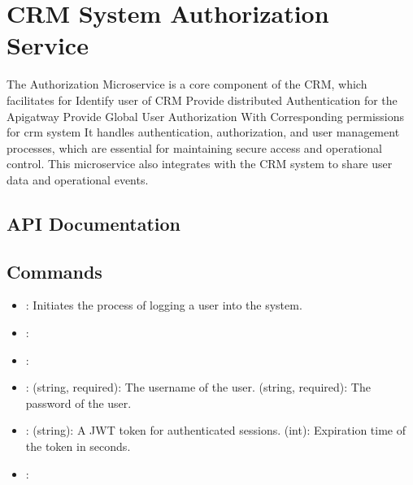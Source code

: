 \documentclass[letterpaper,10pt,english]{sphinxmanual}
\begin{document}
\section{CRM System Authorization Service}
\label{\detokenize{crm_system/authorization_service:crm-system-authorization-service}}\label{\detokenize{crm_system/authorization_service::doc}}
\sphinxAtStartPar
The Authorization Microservice is a core component of the CRM, which facilitates for
\sphinxhyphen{} Identify user of CRM
\sphinxhyphen{} Provide distributed Authentication for the Apigatway
\sphinxhyphen{} Provide Global User Authorization With Corresponding permissions for crm system
It handles authentication, authorization, and user management processes, which are essential for maintaining secure access and operational control. This microservice also integrates with the CRM system to share user data and operational events.



\subsection{API Documentation}
\label{\detokenize{crm_system/authorization_service:api-documentation}}

\subsection{Commands}
\label{\detokenize{crm_system/authorization_service:commands}}
\sphinxAtStartPar
{}
\begin{itemize}
\item {} 
\sphinxAtStartPar
{}: Initiates the process of logging a user into the system.

\item {} 
\sphinxAtStartPar
{}: 

\item {} 
\sphinxAtStartPar
{}: 

\item {} 
\sphinxAtStartPar
{}:
\sphinxhyphen{}  (string, required): The username of the user.
\sphinxhyphen{}  (string, required): The password of the user.

\item {} 
\sphinxAtStartPar
{}:
\sphinxhyphen{}  (string): A JWT token for authenticated sessions.
\sphinxhyphen{}  (int): Expiration time of the token in seconds.

\item {} 
\sphinxAtStartPar
{}: 

\end{itemize}
\end{document}
